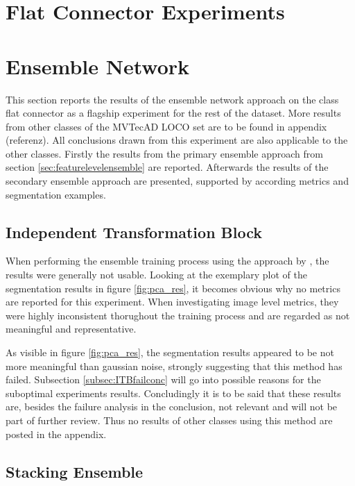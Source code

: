 

\section{Flat Connector Experiments}
\label{sec:faltconnectorxperiments}


\section{Ensemble Network}
\label{sec:ensembleresults}

This section reports the results of the ensemble network approach on the class flat connector %
as a flagship experiment for the rest of the dataset. More results from other classes of the MVTecAD LOCO \cite{LOCODentsAndScratchesBergmann2022} set are to be found in appendix (referenz). All conclusions drawn from this 
experiment are also applicable to the other classes. Firstly the results from the primary ensemble approach from section \ref{sec:featurelevelensemble} are reported. Afterwards 
the results of the secondary ensemble approach are presented, supported by according metrics and segmentation examples.


\subsection{Independent Transformation Block}
\label{subsec:ITBfail}

When performing the ensemble training process using the approach by \cite{EnsembleHeller2023}, the results were generally not usable. Looking at the exemplary plot of the segmentation 
results in figure \ref{fig:pca_res}, it becomes obvious why no metrics are reported for this experiment. When investigating image level metrics, they were highly inconsistent thorughout 
the training process and are regarded as not meaningful and representative.



As visible in figure \ref{fig:pca_res}, the segmentation results appeared to be not more meaningful than gaussian noise, strongly suggesting that this method has failed. Subsection 
\ref{subsec:ITBfailconc} will go into possible reasons for the suboptimal experiments results. Concludingly it is to be said that these results are, besides the failure analysis 
in the conclusion, not relevant and will not be part of further review. Thus no results of other classes using this method are posted in the appendix.

\subsection{Stacking Ensemble}
\label{subsec:stacking}


